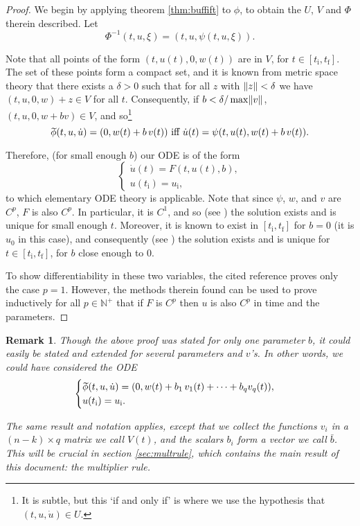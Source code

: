 \documentclass{article}
\theoremstyle{plain}
\theoremstyle{plain}
\newtheorem{remark}{Remark}
\theoremstyle{nonumberplain}
\newtheorem{proof}{Dem}
\theoremstyle{empty}
\newcommand{\N}{\mathbb{N}}
\newcommand{\tstart}{\mathrm{i}}
\newcommand{\tend}{\mathrm{f}}
\newcommand{\wtphi}{
  \mspace{2mu}
  \widetilde{\mspace{-2mu}\smash[t]{\phi}}
}
\DeclarePairedDelimiter\norm{\lVert}{\rVert}
\newcommand{\vecb}{{\bar{b}}}
\begin{document}
\begin{proof}
We begin by applying theorem \ref{thm:buffift} to $\phi$, to obtain the $U$, $V$ and $\Phi$ therein described. Let
\[\Phi^{-1}(t,u,\xi) = (t,u,\psi(t,u,\xi)).\]

Note that all points of the form $(t,u(t),0,w(t))$ are in $V$, for $t \in [t_\tstart, t_\tend]$. The set of these points form a compact set, and it is known from metric space theory that there exists a $\delta > 0$ such that for all $z$ with $\norm z < \delta$ we have $(t,u,0,w) + z \in V$ for all $t$. Consequently, if $b < \delta / \max \norm v$, $(t,u,0,w+bv) \in V$, and so\footnote{It is subtle, but this `if and only if' is where we use the hypothesis that $(t,u,\dot u) \in U$.}
\[\wtphi(t, u, \dot u) = (0, w(t) + b\,v(t)) \text{ iff } \dot u(t) = \psi(t,u(t),w(t) + b\,v(t)).\]

Therefore, (for small enough $b$) our ODE is of the form
\[
\begin{cases}
\dot u(t) = F(t,u(t),b),\\
u(t_\tstart) = u_\tstart,
\end{cases}
\]
to which elementary ODE theory is applicable. Note that since $\psi$, $w$, and $v$ are $C^p$, $F$ is also $C^p$. In particular, it is $C^1$, and so (see \cite[p.74]{perko}) the solution exists and is unique for small enough $t$. Moreover, it is known to exist in $[t_\tstart, t_\tend]$ for $b = 0$ (it is $u_0$ in this case), and consequently (see \cite[thm.2,~p.84]{perko}) the solution exists and is unique for $t \in [t_\tstart,t_\tend]$, for $b$ close enough to 0.

To show differentiability in these two variables, the cited reference proves only the case $p = 1$. However, the methods therein found can be used to prove inductively for all $p \in \N^+$ that if $F$ is $C^p$ then $u$ is also $C^p$ in time and the parameters.
\end{proof}

\begin{remark}\label{rmk:perturbation}
Though the above proof was stated for only one parameter $b$, it could easily be stated and extended for several parameters and $v$'s. In other words, we could have considered the ODE
\[
\begin{cases}
\wtphi(t, u, \dot u) = (0, w(t) + b_1\,v_1(t) + \dots + b_q v_q(t)),\\
u(t_\tstart) = u_\tstart.
\end{cases}
\]

The same result and notation applies, except that we collect the functions $v_i$ in a $(n-k) \times q$ matrix we call $V(t)$, and the scalars $b_i$ form a vector we call $\vecb$. This will be crucial in section \ref{sec:multrule}, which contains the main result of this document: the multiplier rule.
\end{remark}
\end{document}
